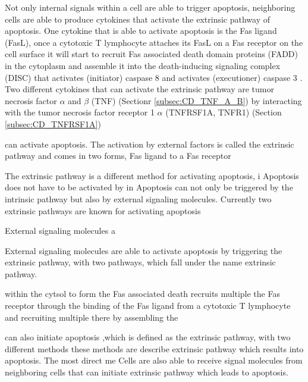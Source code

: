 Not only internal signals within a cell are able to trigger apoptosis, neighboring cells are able to produce cytokines that activate the extrinsic pathway of apoptosis. One cytokine that is able to activate apoptosis is the Fas ligand (FasL), once a cytotoxic T lymphocyte attaches its FasL on a Fas receptor on the cell surface it will start to recruit Fas associated death domain proteins (FADD) in the cytoplasm and assemble it into the death-inducing signaling complex (DISC) that activates (initiator) caspase 8 and activates (executioner) caspase 3 \cite{}.
Two different cytokines that can activate the extrinsic pathway are tumor necrosis factor $\alpha$ and $\beta$ (TNF) (Sectionr \ref{subsec:CD_TNF_A_B}) by interacting with the tumor necrosis factor receptor 1 $\alpha$ (TNFRSF1A, TNFR1) (Section \ref{subsec:CD_TNFRSF1A})


 can activate apoptosis.  The activation by external factors is called the extrinsic pathway and comes in two forms,  
Fas ligand to a Fas receptor 


The extrinsic pathway is a different method for activating apoptosis, i
Apoptosis does not have to be activated by in
Apoptosis can not only be triggered by the intrinsic pathway but also by external signaling molecules. 
Currently two extrinsic pathways are known for activating apoptosis


External signaling molecules a


External signaling molecules are able to activate apoptosis by triggering the extrinsic pathway, with two pathways, which fall under the name extrinsic pathway.

 within the cytsol to form the Fas associated death  recruits multiple   the Fas receptor through the binding of the Fas ligand from a cytotoxic T lymphocyte and recruiting multiple  there by assembling the 

 can also initiate apoptosis ,which is defined as the extrinsic pathway, with two different methods these methods are describe extrinsic pathway which results into apoptosis.  The most direct me
Cells are also able to receive signal molecules from neighboring cells that can initiate extrinsic pathway which leads to apoptosis. 


